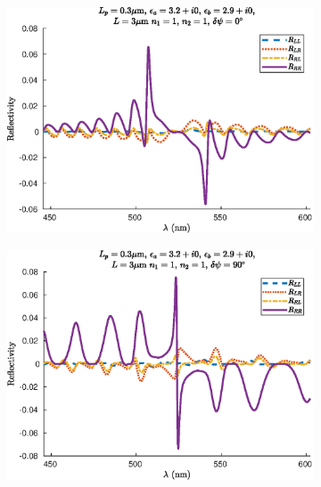 \begin{figure}
	\centering
	\begin{subfigure}{0.49\linewidth}
		\includegraphics[width=\linewidth]{plots/defect/no_defect/comparison_reflection}
		\caption{}
	\end{subfigure}
	\begin{subfigure}{0.49\linewidth}
		\includegraphics[width=\linewidth]{plots/defect/reflectivity/comparison_reflection}
		\caption{}
	\end{subfigure}
	\begin{subfigure}{0.49\linewidth}

\end{subfigure}
\end{figure}
